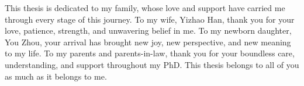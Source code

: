 
\begin{dedication} 

This thesis is dedicated to my family, whose love and support have carried me through every stage of this journey.
%
To my wife, Yizhao Han, thank you for your love, patience, strength, and unwavering belief in me. To my newborn daughter, You Zhou, your arrival has brought new joy, new perspective, and new meaning to my life.
%
To my parents and parents-in-law, thank you for your boundless care, understanding, and support throughout my PhD. This thesis belongs to all of you as much as it belongs to me.

\end{dedication}
